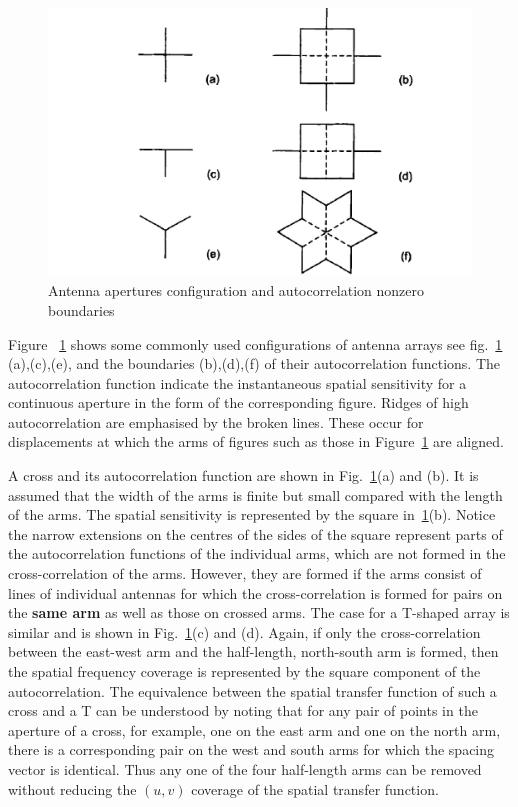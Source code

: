 \begin{figure}[htbp]
\center
    \includegraphics[scale= 0.2]{Figures/antconf}
 	\caption[Antenna aperture configurations and autocorrelation nonzero boundaries  ]{Antenna apertures configuration and autocorrelation nonzero boundaries~\citep[Pg.~136,~Fig.~5.7]{thompson2008interferometry}}
	\label{fig:antConf}
\end{figure}
Figure ~\ref{fig:antConf} shows some commonly used configurations of antenna arrays see fig.~\ref{fig:antConf} {\color{blue}(a),(c),(e)}, and the boundaries {\color{blue}(b),(d),(f)} of their autocorrelation functions. The autocorrelation function indicate the instantaneous spatial sensitivity for a continuous aperture in the form of the corresponding figure. Ridges of high autocorrelation are emphasised by the broken lines. These occur for displacements at which the arms of figures such
as those in Figure~\ref{fig:antConf} are aligned. 

A cross and its autocorrelation function are shown in Fig.~\ref{fig:antConf}{\color{blue}(a)} and {\color{blue}(b)}. It is assumed that the width of the arms is finite but small compared with the length of the arms. The spatial sensitivity is represented by the square in~\ref{fig:antConf}{\color{blue}(b)}. Notice the narrow extensions on the centres of the sides of the square represent parts of the autocorrelation functions of the individual arms, which are not formed in the cross-correlation of the arms. However, they are formed if the arms consist of lines of individual antennas for which the cross-correlation is formed for pairs on the \textbf{same arm} as well as those on crossed arms. The case for a T-shaped array is similar and is shown in Fig.~\ref{fig:antConf}{\color{blue}(c)} and {\color{blue}(d)}. Again, if only the cross-correlation between the east-west arm and the half-length, north-south arm is formed, then the spatial frequency coverage is represented by the square component of the autocorrelation. The equivalence between
the spatial transfer function of such a cross and a T can be understood by noting that for any pair of points in the aperture of a cross, for example, one on the east arm and one on the north arm, there is a corresponding pair on the west and south arms for which the spacing vector is identical. Thus any one of the four half-length arms can be removed without reducing the $(u,v)$ coverage of the spatial transfer function.

